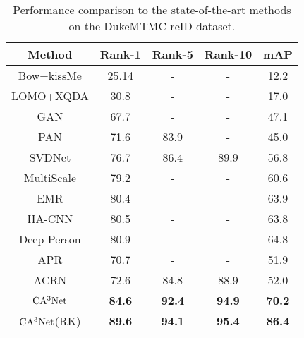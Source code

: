 \documentclass[sigconf]{acmart}
\begin{document}
\begin{table}[htbp]
	\begin{center}
		\newcommand{\tabincell}[2]{\begin{tabular}{@{}#1@{}}#2\end{tabular}}
		\begin{tabular}{|c|c|c|c|c|}
			\hline
			\textbf{Method}&\textbf{Rank-1}&\textbf{Rank-5}&\textbf{Rank-10}&\textbf{mAP}\\
			\hline
			Bow+kissMe\cite{17}&25.14&-&-&12.2\\
			\hline
			LOMO+XQDA\cite{2}&30.8&-&-&17.0\\
			\hline
			\hline
			GAN\cite{18}&67.7&-&-&47.1\\
			\hline
			PAN\cite{28}&71.6&83.9&-&45.0\\
			\hline
			SVDNet\cite{26}&76.7&86.4&89.9&56.8\\
			\hline
			MultiScale \cite{30}&79.2&-&-&60.6\\
			\hline
			EMR\cite{36}&80.4&-&-&63.9\\
			\hline
			HA-CNN\cite{7}&80.5&-&-&63.8\\
			\hline
			Deep-Person\cite{37}&80.9&-&-&64.8\\
			\hline
			\hline
			APR\cite{12}&70.7&-&-&51.9\\
			\hline
			ACRN\cite{11}&72.6&84.8&88.9&52.0\\
			\hline
			\hline
			$\rm CA^3Net$&\textbf{84.6}&\textbf{92.4}&\textbf{94.9}&\textbf{70.2}\\
			\hline
			$\rm CA^3Net$(RK)&\textbf{89.6}&\textbf{94.1}&\textbf{95.4}&\textbf{86.4}\\
			\hline
		\end{tabular}
	\end{center}
	\caption{Performance comparison to the state-of-the-art methods on the DukeMTMC-reID dataset.}

\end{table}
\end{document}
